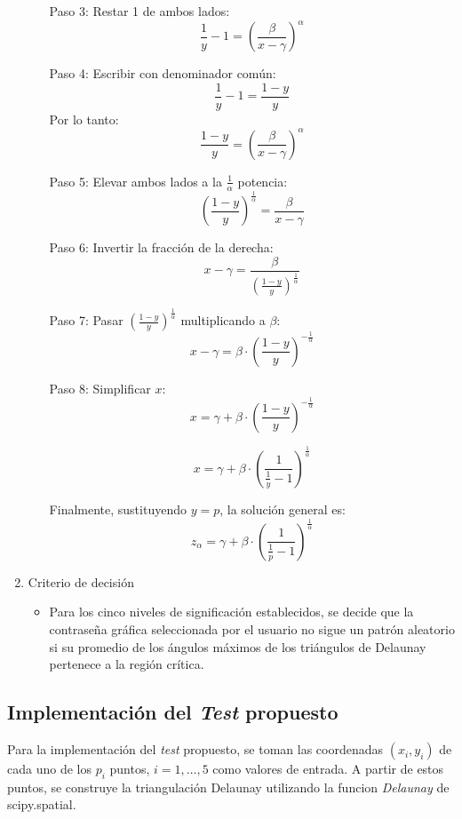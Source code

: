 \documentclass[12pt]{report}
\begin{document}
\begin{enumerate}
\begin{itemize}
		Paso 3: Restar 1 de ambos lados:
		\[
		\frac{1}{y} - 1 = \left( \frac{\beta}{x - \gamma} \right)^\alpha
		\]
		
		Paso 4: Escribir con denominador común:
		\[
		\frac{1}{y} - 1 = \frac{1 - y}{y}
		\]
		Por lo tanto:
		\[
		\frac{1 - y}{y} = \left( \frac{\beta}{x - \gamma} \right)^\alpha
		\]
		
		Paso 5: Elevar ambos lados a la \( \frac{1}{\alpha} \) potencia:
		\[
		\left( \frac{1 - y}{y} \right)^{\frac{1}{\alpha}} = \frac{\beta}{x - \gamma}
		\]
		
		Paso 6: Invertir la fracción de la derecha:
		\[
		x - \gamma = \frac{\beta}{\left( \frac{1 - y}{y} \right)^{\frac{1}{\alpha}}}
		\]
				
		Paso 7: Pasar \( \left( \frac{1 - y}{y} \right)^{\frac{1}{\alpha}} \) multiplicando a \( \beta \):
		\[
		x - \gamma = \beta \cdot \left( \frac{1 - y}{y} \right)^{-\frac{1}{\alpha}}
		\]
		
		Paso 8: Simplificar \( x \):
		\[
		x = \gamma + \beta \cdot \left( \frac{1 - y}{y} \right)^{-\frac{1}{\alpha}}
		\]
		
		\[
		x = \gamma + \beta \cdot \left( \frac{1}{\frac{1}{y}-1} \right)^{\frac{1}{\alpha}}
		\]
		
		Finalmente, sustituyendo \( y = p \), la solución general es:
		\[
		 z_\alpha = \gamma + \beta \cdot \left( \frac{1}{\frac{1}{p}-1} \right)^{\frac{1}{\alpha}}
		\]
		
		
	\end{itemize}
	\item Criterio de decisión
	\begin{itemize}
		\item Para los cinco niveles de significación establecidos, se decide que la contraseña gráfica seleccionada por el usuario no sigue un patrón aleatorio si su promedio de los ángulos máximos de los triángulos de Delaunay  pertenece a la región crítica. 
	\end{itemize}
\end{enumerate}
\subsection{Implementación del \textit{Test} propuesto }

Para la implementación del \textit{test} propuesto, se toman las coordenadas \((x_i, y_i)\) de cada uno de los \(p_i\) puntos, \(i = 1, \ldots, 5\) como valores de entrada. A partir de estos puntos, se construye la triangulación Delaunay utilizando la funcion \textit{Delaunay} de scipy.spatial.
\end{document}
